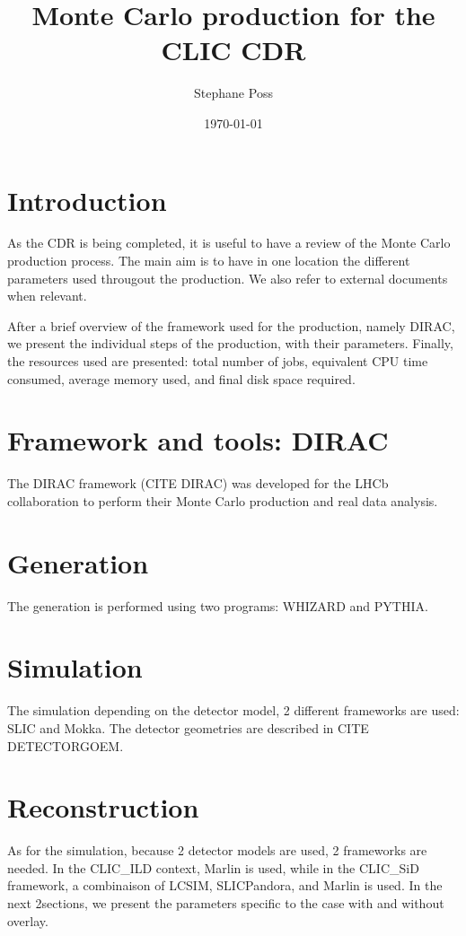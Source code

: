 \documentclass{article}
\author{Stephane Poss}
\title{Monte Carlo production for the CLIC CDR}
\date{\today}
\begin{document}
\maketitle
{}
\section{Introduction}
As the CDR is being completed, it is useful to have a review of the Monte Carlo production process. The main aim is to 
have in one location the different parameters used througout the production. We also refer to external documents when 
relevant. 

After a brief overview of the framework used for the production, namely DIRAC, we present the individual steps
of the production, with their parameters. Finally, the resources used are presented: total number of jobs, equivalent
CPU time consumed, average memory used, and final disk space required.

\section{Framework and tools: DIRAC}

The DIRAC framework (CITE DIRAC) was developed for the LHCb collaboration to perform their Monte Carlo production and 
real data analysis. 

\section{Generation}
The generation is performed using two programs: WHIZARD and PYTHIA.

\section{Simulation}
The simulation depending on the detector model, 2 different frameworks are used: SLIC and Mokka. The detector 
geometries are described in CITE DETECTORGOEM.

\section{Reconstruction}
As for the simulation, because 2 detector models are used, 2 frameworks are needed. In the CLIC\_ILD context, Marlin 
is used, while in the CLIC\_SiD framework, a combinaison of LCSIM, SLICPandora, and Marlin is used. In the next 2sections, 
we present the parameters specific to the case with and without overlay.
\end{document}
